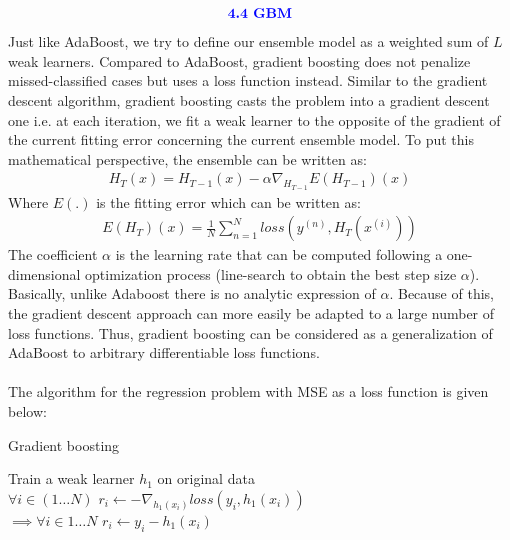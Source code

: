 \documentclass{homework}
\begin{document}
\begin{align*}
    \textcolor{blue}{ \text{{\textbf{4.4 GBM}}}}
 \end{align*}
 Just like AdaBoost, we try to define our ensemble model as a weighted sum of $L$ weak learners. Compared to AdaBoost, gradient boosting does not penalize missed-classified cases but uses a loss function instead. Similar to the gradient descent algorithm, gradient boosting casts the problem into a gradient descent one i.e. at each iteration, we fit a weak learner to the opposite of the gradient of the current fitting error concerning the current ensemble model. To put this mathematical perspective, the ensemble can be written as:
 \begin{align*}
    H_T(x) = H_{T-1}(x) - \alpha \nabla_{H_{T-1}} E(H_{T-1})(x)
 \end{align*}
 Where $E(.)$ is the fitting error which can be written as:
 \begin{align*}
    E(H_{T})(x) = \frac{1}{N} \sum_{n=1}^{N} loss(y^{(n)},H_{T}(x^{(i)}))
 \end{align*}
 The coefficient $\alpha$ is the learning rate that can be computed following a one-dimensional optimization process (line-search to obtain the best step size $\alpha$). Basically, unlike Adaboost there is no analytic expression of $\alpha$. Because of this, the gradient descent approach can more easily be adapted to a large number of loss functions. Thus, gradient boosting can be considered as a generalization of AdaBoost to arbitrary differentiable loss functions. \\
\\
 The algorithm for the regression problem with MSE as a loss function is given below:
 \begin{algorithm*}
    \caption{Gradient boosting}
    Train a weak learner $h_1$ on original data \\
    $\forall i\in(1 \dots N)$ $r_i \gets -\nabla_{h_1(x_i)}loss(y_i,h_1(x_i))$ \\
    $\implies \forall i\in{1 \dots N}$ $r_i \gets y_i - h_1(x_i)$ \\
 \end{algorithm*}
\end{document}
